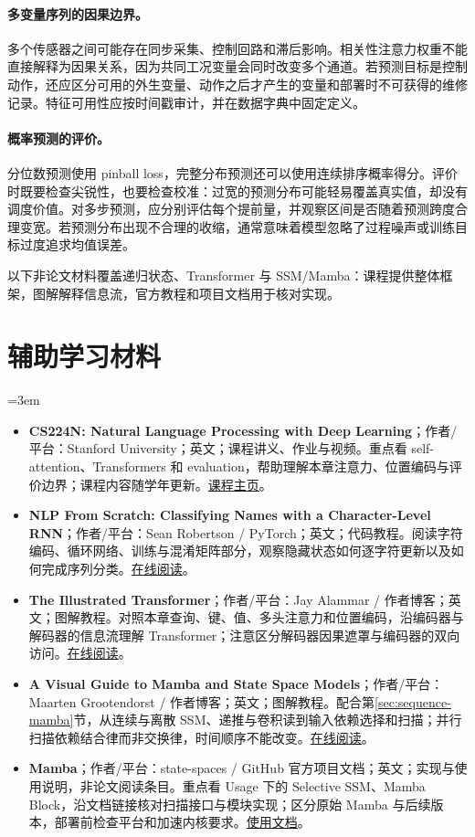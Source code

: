 \paragraph{多变量序列的因果边界。}
多个传感器之间可能存在同步采集、控制回路和滞后影响。相关性注意力权重不能直接解释为因果关系，因为共同工况变量会同时改变多个通道。若预测目标是控制动作，还应区分可用的外生变量、动作之后才产生的变量和部署时不可获得的维修记录。特征可用性应按时间戳审计，并在数据字典中固定定义。

\paragraph{概率预测的评价。}
分位数预测使用 pinball loss，完整分布预测还可以使用连续排序概率得分。评价时既要检查尖锐性，也要检查校准：过宽的预测分布可能轻易覆盖真实值，却没有调度价值。对多步预测，应分别评估每个提前量，并观察区间是否随着预测跨度合理变宽。若预测分布出现不合理的收缩，通常意味着模型忽略了过程噪声或训练目标过度追求均值误差。

以下非论文材料覆盖递归状态、Transformer 与 SSM/Mamba：课程提供整体框架，图解解释信息流，官方教程和项目文档用于核对实现。
\section*{辅助学习材料}
\begingroup
\emergencystretch=3em
\begin{itemize}
\item \textbf{CS224N: Natural Language Processing with Deep Learning}；作者/平台：Stanford University；英文；课程讲义、作业与视频。重点看 self-attention、Transformers 和 evaluation，帮助理解本章注意力、位置编码与评价边界；课程内容随学年更新。\href{https://web.stanford.edu/class/cs224n/}{课程主页}。
\item \textbf{NLP From Scratch: Classifying Names with a Character-Level RNN}；作者/平台：Sean Robertson / PyTorch；英文；代码教程。阅读字符编码、循环网络、训练与混淆矩阵部分，观察隐藏状态如何逐字符更新以及如何完成序列分类。\href{https://docs.pytorch.org/tutorials/intermediate/char\_rnn\_classification\_tutorial.html}{在线阅读}。
\item \textbf{The Illustrated Transformer}；作者/平台：Jay Alammar / 作者博客；英文；图解教程。对照本章查询、键、值、多头注意力和位置编码，沿编码器与解码器的信息流理解 Transformer；注意区分解码器因果遮罩与编码器的双向访问。\href{https://jalammar.github.io/illustrated-transformer/}{在线阅读}。
\item \textbf{A Visual Guide to Mamba and State Space Models}；作者/平台：Maarten Grootendorst / 作者博客；英文；图解教程。配合第\ref{sec:sequence-mamba}节，从连续与离散 SSM、递推与卷积读到输入依赖选择和扫描；并行扫描依赖结合律而非交换律，时间顺序不能改变。\href{https://www.maartengrootendorst.com/blog/mamba/}{在线阅读}。
\item \textbf{Mamba}；作者/平台：state-spaces / GitHub 官方项目文档；英文；实现与使用说明，非论文阅读条目。重点看 Usage 下的 Selective SSM、Mamba Block，沿文档链接核对扫描接口与模块实现；区分原始 Mamba 与后续版本，部署前检查平台和加速内核要求。\href{https://github.com/state-spaces/mamba\#usage}{使用文档}。
\end{itemize}
\endgroup
